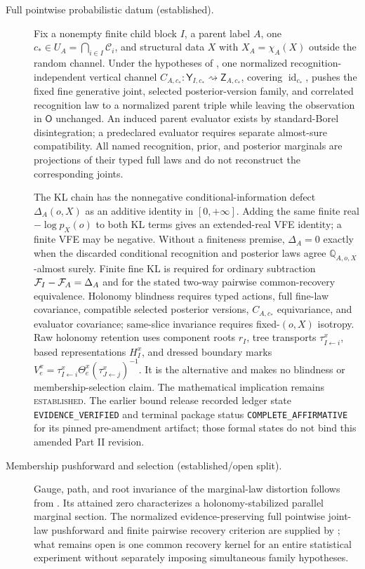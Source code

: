 \begin{description}
\item[Full pointwise probabilistic datum (established).]
Fix a nonempty finite child block \(I\), a parent label \(A\), one
\(c_*\in U_A=\bigcap_{i\in I}\mathcal C_i\), and structural data \(X\)
with \(X_A=\chi_A(X)\) outside the random channel. Under the hypotheses of
, one normalized recognition-independent
vertical channel
\(C_{A,c_*}:\mathsf Y_{I,c_*}\rightsquigarrow\mathsf Z_{A,c_*}\), covering
\(\operatorname{id}_{c_*}\), pushes the fixed fine generative
joint, selected posterior-version family, and correlated recognition law to a
normalized parent triple while leaving the observation in \(\mathsf O\)
unchanged. An induced parent evaluator exists by standard-Borel disintegration;
a predeclared evaluator requires separate almost-sure compatibility. All named
recognition, prior, and posterior marginals are projections of their typed full
laws and do not reconstruct the corresponding joints.

The KL chain has the nonnegative conditional-information defect
\(\Delta_A(o,X)\) as an additive identity in \([0,+\infty]\). Adding the same
finite real \(-\log p_X(o)\) to both KL terms gives an extended-real VFE
identity; a finite VFE may be negative. Without a finiteness premise,
\(\Delta_A=0\) exactly when the discarded conditional recognition and
posterior laws agree \(\mathbb Q_{A,o,X}\)-almost surely. Finite fine KL is
required for ordinary subtraction
\(\mathcal F_I-\mathcal F_A=\Delta_A\) and for the stated two-way pairwise
common-recovery equivalence. Holonomy blindness requires
typed actions, full fine-law covariance, compatible selected posterior versions,
\(C_{A,c_*}\) equivariance, and evaluator covariance; same-slice invariance requires
fixed-\((o,X)\) isotropy. Raw holonomy retention uses component roots \(r_I\),
tree transports \(\tau^x_{I\leftarrow i}\), based representations \(H_I^x\),
and dressed boundary marks
\(V_e^x=\tau^x_{I\leftarrow i}\Theta_e^x
(\tau^x_{J\leftarrow j})^{-1}\). It is the alternative and makes no
blindness or membership-selection claim. The mathematical implication remains
\textsc{established}. The earlier bound release recorded ledger state
\texttt{EVIDENCE\_VERIFIED} and terminal package status
\texttt{COMPLETE\_AFFIRMATIVE} for its pinned pre-amendment artifact; those
formal states do not bind this amended Part II revision. 

\item[Membership pushforward and selection (established/open split).]
Gauge, path, and root invariance of the marginal-law distortion follows from
. Its attained zero characterizes a
holonomy-stabilized parallel marginal section. The normalized
evidence-preserving full pointwise joint-law pushforward and finite pairwise
recovery criterion are supplied by ; what
remains open is one common recovery kernel for an entire statistical experiment
without separately imposing simultaneous family hypotheses.


\end{description}
